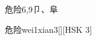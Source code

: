 \begin{entry}{危险}{6,9}{⼙、⾩}
  \begin{phonetics}{危险}{wei1xian3}[][HSK 3]
  \end{phonetics}
\end{entry}
